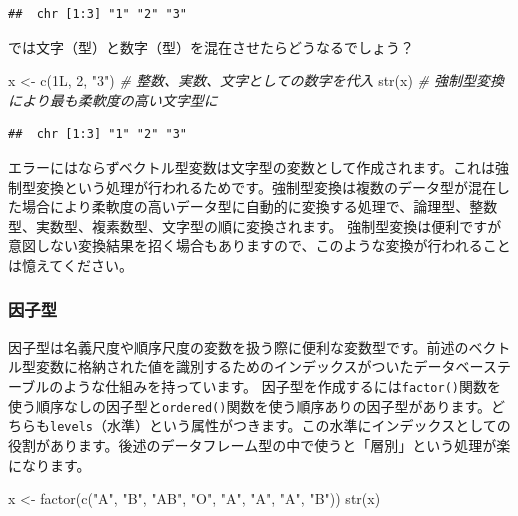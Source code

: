 \documentclass[
  12pt,
]{book}
\newenvironment{Shaded}{\begin{snugshade}}{\end{snugshade}}
\newcommand{\CommentTok}[1]{\textcolor[rgb]{0.56,0.35,0.01}{\textit{#1}}}
\newcommand{\DecValTok}[1]{\textcolor[rgb]{0.00,0.00,0.81}{#1}}
\newcommand{\FunctionTok}[1]{\textcolor[rgb]{0.00,0.00,0.00}{#1}}
\newcommand{\NormalTok}[1]{#1}
\newcommand{\OtherTok}[1]{\textcolor[rgb]{0.56,0.35,0.01}{#1}}
\newcommand{\StringTok}[1]{\textcolor[rgb]{0.31,0.60,0.02}{#1}}
\begin{document}
\begin{verbatim}
##  chr [1:3] "1" "2" "3"
\end{verbatim}

では文字（型）と数字（型）を混在させたらどうなるでしょう？

\begin{Shaded}
\begin{Highlighting}[numbers=left,,]
\NormalTok{x }\OtherTok{\textless{}{-}} \FunctionTok{c}\NormalTok{(1L, }\DecValTok{2}\NormalTok{, }\StringTok{"3"}\NormalTok{)      }\CommentTok{\# 整数、実数、文字としての数字を代入}
\FunctionTok{str}\NormalTok{(x)                  }\CommentTok{\# 強制型変換により最も柔軟度の高い文字型に}
\end{Highlighting}
\end{Shaded}

\begin{verbatim}
##  chr [1:3] "1" "2" "3"
\end{verbatim}

エラーにはならずベクトル型変数は文字型の変数として作成されます。これは強制型変換という処理が行われるためです。強制型変換は複数のデータ型が混在した場合により柔軟度の高いデータ型に自動的に変換する処理で、論理型、整数型、実数型、複素数型、文字型の順に変換されます。 強制型変換は便利ですが意図しない変換結果を招く場合もありますので、このような変換が行われることは憶えてください。

\hypertarget{ux56e0ux5b50ux578b}{%
\subsubsection{因子型}\label{ux56e0ux5b50ux578b}}

因子型は名義尺度や順序尺度の変数を扱う際に便利な変数型です。前述のベクトル型変数に格納された値を識別するためのインデックスがついたデータベーステーブルのような仕組みを持っています。 因子型を作成するには\texttt{factor()}関数を使う順序なしの因子型と\texttt{ordered()}関数を使う順序ありの因子型があります。どちらも\texttt{levels}（水準）という属性がつきます。この水準にインデックスとしての役割があります。後述のデータフレーム型の中で使うと「層別」という処理が楽になります。

\begin{Shaded}
\begin{Highlighting}[numbers=left,,]
\NormalTok{x }\OtherTok{\textless{}{-}} \FunctionTok{factor}\NormalTok{(}\FunctionTok{c}\NormalTok{(}\StringTok{"A"}\NormalTok{, }\StringTok{"B"}\NormalTok{, }\StringTok{"AB"}\NormalTok{, }\StringTok{"O"}\NormalTok{, }\StringTok{"A"}\NormalTok{, }\StringTok{"A"}\NormalTok{, }\StringTok{"A"}\NormalTok{, }\StringTok{"B"}\NormalTok{))}
\FunctionTok{str}\NormalTok{(x)}
\end{Highlighting}
\end{Shaded}
\end{document}
